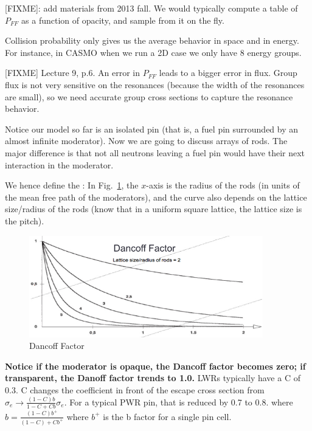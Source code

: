 \documentclass{school-22.211-notes}
\begin{document}
[FIXME]: add materials from 2013 fall. We would typically compute a table of $P_{FF}$ as a function of opacity, and sample from it on the fly. 

Collision probability only gives us the average behavior in space and in energy. For instance, in CASMO when we run a 2D case we only have 8 energy groups. 

[FIXME] Lecture 9, p.6. An error in $P_{FF}$ leads to a bigger error in flux. Group flux is not very sensitive on the resonances (because the width of the resonances are small), so we need accurate group cross sections to capture the resonance behavior. 




\clearpage
{}
Notice our model so far is an isolated pin (that is, a fuel pin surrounded by an almost infinite moderator). Now we are going to discuss arrays of rods. The major difference is that not all neutrons leaving a fuel pin would have their next interaction in the moderator. 

We hence define the :
In Fig.~\ref{dancoff}, the $x$-axis is the radius of the rods (in units of the mean free path of the moderators), and the curve also depends on the lattice size/radius of the rods (know that in a uniform square lattice, the lattice size is the pitch).  
\begin{figure}[ht]
  \centering
  \includegraphics[width=4in]{images/r-m/dancoff.png}
  \caption{Dancoff Factor} \label{dancoff}
\end{figure}
\textbf{Notice if the moderator is opaque, the Dancoff factor becomes zero; if transparent, the Danoff factor trends to 1.0.}  LWRs typically have a C of 0.3. 
C changes the coefficient in front of the escape cross section from $\sigma_e \to \frac{(1-C)b}{1-C + Cb} \sigma_e$. For a typical PWR pin, that is reduced by 0.7 to 0.8.
where $b = \frac{(1-C)b^+}{(1-C) + C b^+}$ where $b^+$ is the b factor for a single pin cell. 
\end{document}
